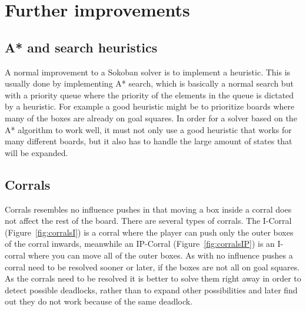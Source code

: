 \documentclass[a4paper,11pt]{article}
\renewcommand{\*}[0]{\cdot}
\begin{document}
\section{Further improvements}

\subsection{A* and search heuristics}

A normal improvement to a Sokoban solver is to implement a heuristic. This is
usually done by implementing A* search, which is basically a normal search but
with a priority queue where the priority of the elements in the queue is
dictated by a heuristic. For example a good heuristic might be to prioritize
boards where many of the boxes are already on goal squares. In order for a
solver based on the A* algorithm to work well, it must not only use a good
heuristic that works for many different boards, but it also has to handle the
large amount of states that will be expanded.


\subsection{Corrals}

Corrals resembles no influence pushes in that moving a box inside a corral does
not affect the rest of the board.  There are several types of corrals. The
I-Corral (Figure~\ref{fig:corralsI}) is a corral where the player can push only
the outer boxes of the corral inwards, meanwhile an IP-Corral
(Figure~\ref{fig:corralsIP}) is an I-corral where you can move all of the outer
boxes. As with no influence pushes a corral need to be resolved sooner or later,
if the boxes are not all on goal squares.  As the corrals need to be resolved it
is better to solve them right away in order to detect possible deadlocks, rather
than to expand other possibilities and later find out they do not work because
of the same deadlock.


\end{document}
